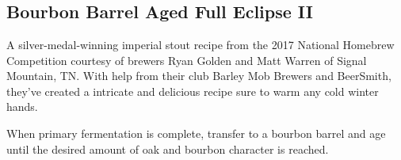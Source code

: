 \part{\stylerussianimperialstout}

\chapter*{Bourbon Barrel Aged Full Eclipse II}

\begin{aboutblock}
A silver-medal-winning imperial stout recipe from the 2017 National Homebrew
Competition courtesy of brewers Ryan Golden and Matt Warren of Signal Mountain, TN.
With help from their club Barley Mob Brewers and BeerSmith, they've created a
intricate and delicious recipe sure to warm any cold winter hands. 
\end{aboutblock}


\begin{methodandtiming}
 
\begin{mashsteps}
\end{mashsteps}

\begin{fermentationsteps}
\end{fermentationsteps}

\begin{directions}
When primary fermentation is complete, transfer to a bourbon barrel and age until
the desired amount of oak and bourbon character is reached.
\end{directions}

\end{methodandtiming}

\pagebreak

\begin{ingredientsblock}

\begin{malts}
\end{malts}

\begin{hops}

\end{hops}

\begin{yeasts}
\end{yeasts}

\end{ingredientsblock}